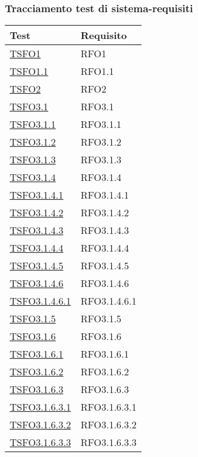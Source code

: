 \subsubsection{Tracciamento test di sistema-requisiti}
\normalsize
\begin{longtable}{|>{\centering}m{5cm}|m{5cm}<{\centering}|}
\hline 
\textbf{Test} & \textbf{Requisito}\\
\hline
\endhead
\hyperlink{TSFO1}{TSFO1} & RFO1\\ \hline
\hyperlink{TSFO1.1}{TSFO1.1} & RFO1.1\\ \hline
\hyperlink{TSFO2}{TSFO2} & RFO2\\ \hline
\hyperlink{TSFO3.1}{TSFO3.1} & RFO3.1\\ \hline
\hyperlink{TSFO3.1.1}{TSFO3.1.1} & RFO3.1.1\\ \hline
\hyperlink{TSFO3.1.2}{TSFO3.1.2} & RFO3.1.2\\ \hline
\hyperlink{TSFO3.1.3}{TSFO3.1.3} & RFO3.1.3\\ \hline
\hyperlink{TSFO3.1.4}{TSFO3.1.4} & RFO3.1.4\\ \hline
\hyperlink{TSFO3.1.4.1}{TSFO3.1.4.1} & RFO3.1.4.1\\ \hline
\hyperlink{TSFO3.1.4.2}{TSFO3.1.4.2} & RFO3.1.4.2\\ \hline
\hyperlink{TSFO3.1.4.3}{TSFO3.1.4.3} & RFO3.1.4.3\\ \hline
\hyperlink{TSFO3.1.4.4}{TSFO3.1.4.4} & RFO3.1.4.4\\ \hline
\hyperlink{TSFO3.1.4.5}{TSFO3.1.4.5} & RFO3.1.4.5\\ \hline
\hyperlink{TSFO3.1.4.6}{TSFO3.1.4.6} & RFO3.1.4.6\\ \hline
\hyperlink{TSFO3.1.4.6.1}{TSFO3.1.4.6.1} & RFO3.1.4.6.1\\ \hline
\hyperlink{TSFO3.1.5}{TSFO3.1.5} & RFO3.1.5\\ \hline
\hyperlink{TSFO3.1.6}{TSFO3.1.6} & RFO3.1.6\\ \hline
\hyperlink{TSFO3.1.6.1}{TSFO3.1.6.1} & RFO3.1.6.1\\ \hline
\hyperlink{TSFO3.1.6.2}{TSFO3.1.6.2} & RFO3.1.6.2\\ \hline
\hyperlink{TSFO3.1.6.3}{TSFO3.1.6.3} & RFO3.1.6.3\\ \hline
\hyperlink{TSFO3.1.6.3.1}{TSFO3.1.6.3.1} & RFO3.1.6.3.1\\ \hline
\hyperlink{TSFO3.1.6.3.2}{TSFO3.1.6.3.2} & RFO3.1.6.3.2\\ \hline
\hyperlink{TSFO3.1.6.3.3}{TSFO3.1.6.3.3} & RFO3.1.6.3.3\\ \hline

\end{longtable}

